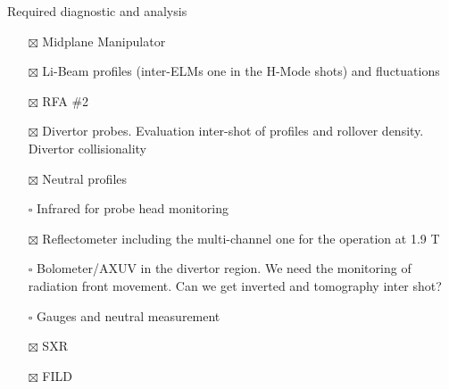 \documentclass[10pt, compress]{beamer}
\begin{document}
\begin{frame}{Required diagnostic and analysis}
  \begin{itemize}
    \item[$\boxtimes$] Midplane Manipulator
    \item[$\boxtimes$] Li-Beam profiles (inter-ELMs one in the H-Mode
      shots) and fluctuations
    \item[$\boxtimes$] RFA \#2
    \item[$\boxtimes$] Divertor probes. Evaluation inter-shot of
      profiles and rollover density. Divertor collisionality
    \item[$\boxtimes$] Neutral profiles
    \item[$\square$] Infrared for probe head monitoring
    \item[$\boxtimes$] Reflectometer including the multi-channel one
      for the operation at 1.9 T
    \item[$\square$] Bolometer/AXUV in the divertor region. We need
      the monitoring of radiation front movement. Can we get inverted
      and tomography inter shot?
    \item[$\square$] Gauges and neutral measurement
    \item[$\boxtimes$] SXR
    \item[$\boxtimes$] FILD  
    \end{itemize}
\end{frame}
\end{document}
